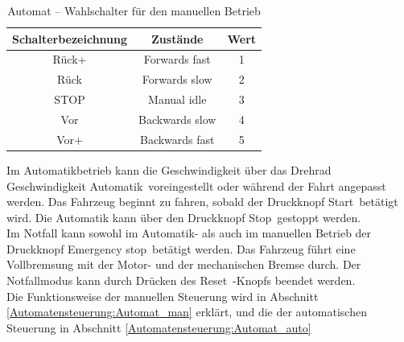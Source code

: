\pagebreak[1]
\begin{table}[!ht]
	\centering
	\caption{Automat – Wahlschalter für den manuellen Betrieb}
	\label{Controlpanel:tab:Wahlschalter}
	\begin{tabular}{ccc}
		\hline
		\textbf{Schalterbezeichnung} & \textbf{Zustände} & \textbf{Wert} \\ \hline
		\multicolumn{1}{c|}{Rück+}   & Forwards fast     & 1             \\
		\multicolumn{1}{c|}{Rück}    & Forwards slow     & 2             \\
		\multicolumn{1}{c|}{STOP}    & Manual idle       & 3             \\
		\multicolumn{1}{c|}{Vor}     & Backwards slow    & 4             \\
		\multicolumn{1}{c|}{Vor+}    & Backwards fast    & 5             \\ \hline
	\end{tabular}
\end{table}
\pagebreak[3]
Im Automatikbetrieb kann die Geschwindigkeit über das Drehrad \frqq Geschwindigkeit Automatik\flqq\ voreingestellt oder während der Fahrt angepasst werden. Das Fahrzeug beginnt zu fahren, sobald der Druckknopf \frqq Start\flqq\ betätigt wird. Die Automatik kann über den Druckknopf \frqq Stop\flqq\ gestoppt werden.\\ Im Notfall kann sowohl im Automatik- als auch im manuellen Betrieb der Druckknopf \frqq Emergency stop\flqq\ betätigt werden. Das Fahrzeug führt eine Vollbremsung mit der Motor- und der mechanischen Bremse durch. Der Notfallmodus kann durch Drücken des \frqq Reset\flqq\ -Knopfs beendet werden.\\
Die Funktionsweise der manuellen Steuerung wird in Abschnitt \ref{Automatensteuerung:Automat_man} erklärt, und die der automatischen Steuerung in Abschnitt \ref{Automatensteuerung:Automat_auto}


